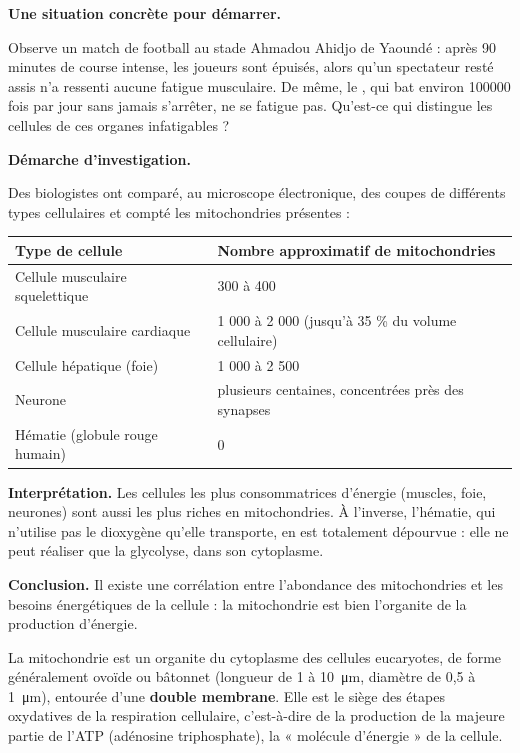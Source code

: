 \documentclass[11pt]{article}
\newcommand{\cle}[1]{{\popxbold\color{popdark}#1}}
\begin{document}
\textbf{Une situation concrète pour démarrer.}\par
Observe un match de football au stade Ahmadou Ahidjo de Yaoundé : après 90 minutes de course intense, les joueurs sont épuisés, alors qu'un spectateur resté assis n'a ressenti aucune fatigue musculaire. De même, le , qui bat environ \num{100000} fois par jour sans jamais s'arrêter, ne se fatigue pas. Qu'est-ce qui distingue les cellules de ces organes infatigables ?

\textbf{Démarche d'investigation.}\par
Des biologistes ont comparé, au microscope électronique, des coupes de différents types cellulaires et compté les mitochondries présentes :

\begin{center}
\begin{tabularx}{\linewidth}{|l|X|}\hline
\rowcolor{popblueL} \textbf{Type de cellule} & \textbf{Nombre approximatif de mitochondries} \\ \hline
Cellule musculaire squelettique & 300 à 400 \\ \hline
Cellule musculaire cardiaque & 1 000 à 2 000 (jusqu'à 35 \% du volume cellulaire) \\ \hline
Cellule hépatique (foie) & 1 000 à 2 500 \\ \hline
Neurone & plusieurs centaines, concentrées près des synapses \\ \hline
Hématie (globule rouge humain) & 0 \\ \hline
\end{tabularx}
\end{center}

\textbf{Interprétation.} Les cellules les plus consommatrices d'énergie (muscles, foie, neurones) sont aussi les plus riches en mitochondries. À l'inverse, l'hématie, qui n'utilise pas le dioxygène qu'elle transporte, en est totalement dépourvue : elle ne peut réaliser que la glycolyse, dans son cytoplasme.

\textbf{Conclusion.} Il existe une \cle{corrélation} entre l'abondance des mitochondries et les besoins énergétiques de la cellule : la mitochondrie est bien l'organite de la production d'énergie.

\begin{definition}[Mitochondrie]
La \cle{mitochondrie} est un organite du \cle{cytoplasme} des cellules eucaryotes, de forme généralement ovoïde ou bâtonnet (longueur de 1 à \SI{10}{\micro m}, diamètre de 0,5 à \SI{1}{\micro m}), entourée d'une \textbf{double membrane}. Elle est le siège des étapes oxydatives de la \cle{respiration cellulaire}, c'est-à-dire de la production de la majeure partie de l'\cle{ATP} (adénosine triphosphate), la « molécule d'énergie » de la cellule.
\end{definition}
\end{document}
